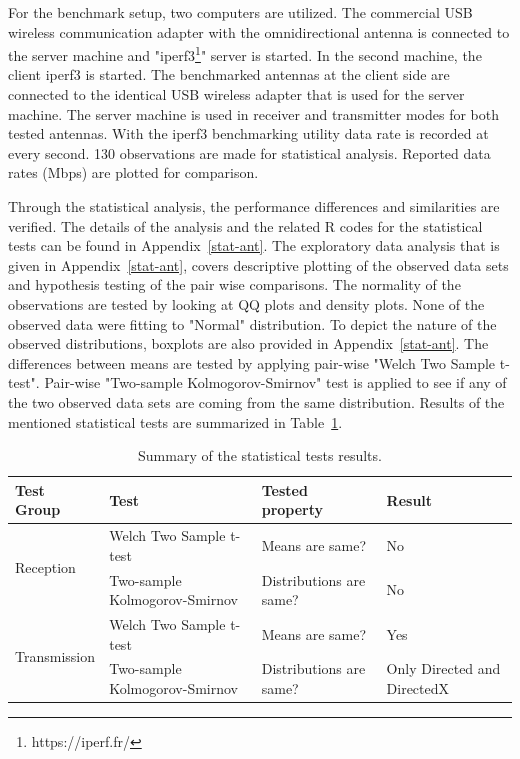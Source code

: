 \documentclass[12pt, oneandhalf, chaparabic, sees, ms]{metu}
\begin{document}
\newpage

For the benchmark setup, two computers are utilized. 
The commercial USB wireless communication adapter with the omnidirectional antenna is connected to the server machine and "iperf3\footnote{https://iperf.fr/}" server is
started. In the second machine, the client iperf3 is started. 
The benchmarked antennas at the client side are connected to the identical USB wireless adapter that is used for the server machine.
The server machine is used in receiver and transmitter modes for both tested antennas.
With the iperf3 benchmarking utility data rate is recorded at every second. 130 observations are made for statistical analysis.
Reported data rates (Mbps) are plotted for comparison.

Through the statistical analysis, the performance differences and similarities are verified. 
The details of the analysis and the related R codes for the statistical tests can be found in Appendix~\ref{stat-ant}.
The exploratory data analysis that is given in Appendix~\ref{stat-ant}, covers descriptive plotting of the observed data sets 
and hypothesis testing of the pair wise comparisons.
The normality of the observations are tested by looking at QQ plots and density plots. 
None of the observed data were fitting to "Normal" distribution.
To depict the nature of the observed distributions, boxplots are also provided in Appendix~\ref{stat-ant}.
The differences between means are tested by applying pair-wise "Welch Two Sample t-test". 
Pair-wise "Two-sample Kolmogorov-Smirnov" test is applied to see if any of the two observed data sets are coming from the same distribution.
Results of the mentioned statistical tests are summarized in Table~\ref{tab:stat-res}.

\vspace{1cm}
\renewcommand{\arraystretch}{1.2}%
\begin{table}[H]
\begin{center}
\caption{Summary of the statistical tests results.}
\label{tab:stat-res}
\begin{adjustbox}{max width=\textwidth}
\begin{tabular}{|l | l | l | l |}
\hline
\rowcolor{lightgray}
\textbf{Test Group}  &\textbf{Test} &\textbf{Tested property} & \textbf{Result}\tabularnewline
\hline \hline 
\multirow{2}{*}{Reception}     & Welch Two Sample t-test       & Means are same?         &  No     \tabularnewline \hhline{~|-|-|-|}
                               & Two-sample Kolmogorov-Smirnov & Distributions are same? &  No                          \tabularnewline \hline
\multirow{2}{*}{Transmission}  & Welch Two Sample t-test       & Means are same?         &  Yes   \tabularnewline \hhline{~|-|-|-|}
                               & Two-sample Kolmogorov-Smirnov & Distributions are same? &  Only Directed and DirectedX  \tabularnewline \hline
\end{tabular}
\end{adjustbox}
\end{center}
\end{table}
\renewcommand{\arraystretch}{1}%
\end{document}
